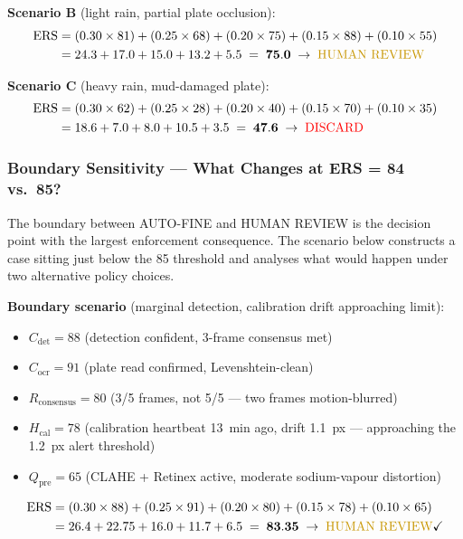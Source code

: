\documentclass[11pt,a4paper]{article}
\begin{document}
\noindent\textbf{Scenario B} (light rain, partial plate occlusion):
\begin{align*}
\text{ERS} &= (0.30 \times 81) + (0.25 \times 68) + (0.20 \times 75) + (0.15 \times 88) + (0.10 \times 55) \\
           &= 24.3 + 17.0 + 15.0 + 13.2 + 5.5 \;=\; \mathbf{75.0} \;\rightarrow\; \textcolor{warningyellow}{\text{HUMAN REVIEW}}
\end{align*}

\noindent\textbf{Scenario C} (heavy rain, mud-damaged plate):
\begin{align*}
\text{ERS} &= (0.30 \times 62) + (0.25 \times 28) + (0.20 \times 40) + (0.15 \times 70) + (0.10 \times 35) \\
           &= 18.6 + 7.0 + 8.0 + 10.5 + 3.5 \;=\; \mathbf{47.6} \;\rightarrow\; \textcolor{red}{\text{DISCARD}}
\end{align*}

\subsubsection*{Boundary Sensitivity — What Changes at ERS = 84 vs.\ 85?}

The boundary between AUTO-FINE and HUMAN REVIEW is the decision point with the largest enforcement consequence. The scenario below constructs a case sitting just below the 85 threshold and analyses what would happen under two alternative policy choices.

\textbf{Boundary scenario} (marginal detection, calibration drift approaching limit):
\begin{itemize}[leftmargin=1.8em, itemsep=0.15em]
    \item $C_{\text{det}} = 88$ (detection confident, 3-frame consensus met)
    \item $C_{\text{ocr}} = 91$ (plate read confirmed, Levenshtein-clean)
    \item $R_{\text{consensus}} = 80$ (3/5 frames, not 5/5 — two frames motion-blurred)
    \item $H_{\text{cal}} = 78$ (calibration heartbeat 13~min ago, drift 1.1~px — approaching the 1.2~px alert threshold)
    \item $Q_{\text{pre}} = 65$ (CLAHE + Retinex active, moderate sodium-vapour distortion)
\end{itemize}

\begin{align*}
\text{ERS} &= (0.30 \times 88) + (0.25 \times 91) + (0.20 \times 80) + (0.15 \times 78) + (0.10 \times 65) \\
           &= 26.4 + 22.75 + 16.0 + 11.7 + 6.5 \;=\; \mathbf{83.35} \;\rightarrow\; \textcolor{warningyellow}{\text{HUMAN REVIEW}} \checkmark
\end{align*}
\end{document}

